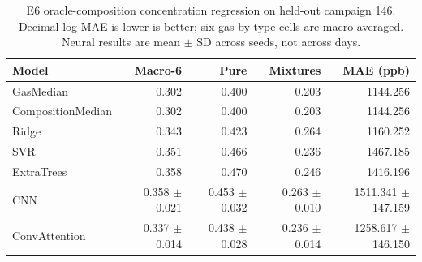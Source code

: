 \begin{table}[t]
\caption{E6 oracle-composition concentration regression on held-out campaign 146. Decimal-log MAE is lower-is-better; six gas-by-type cells are macro-averaged. Neural results are mean $\pm$ SD across seeds, not across days.}
\label{tab:e6}
\centering\small
\begin{tabular}{@{}lrrrr@{}}
\toprule
Model & Macro-6 & Pure & Mixtures & MAE (ppb) \\
\midrule
GasMedian & 0.302 & 0.400 & 0.203 & 1144.256 \\
CompositionMedian & 0.302 & 0.400 & 0.203 & 1144.256 \\
Ridge & 0.343 & 0.423 & 0.264 & 1160.252 \\
SVR & 0.351 & 0.466 & 0.236 & 1467.185 \\
ExtraTrees & 0.358 & 0.470 & 0.246 & 1416.196 \\
CNN & 0.358 $\pm$ 0.021 & 0.453 $\pm$ 0.032 & 0.263 $\pm$ 0.010 & 1511.341 $\pm$ 147.159 \\
ConvAttention & 0.337 $\pm$ 0.014 & 0.438 $\pm$ 0.028 & 0.236 $\pm$ 0.014 & 1258.617 $\pm$ 146.150 \\
\bottomrule
\end{tabular}
\end{table}
